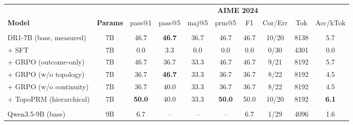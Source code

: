 \begin{table}[!htb]
{\begin{tabular}{@{}l c c c c c c c c c@{}}
\toprule
& & \multicolumn{8}{c}{\textbf{AIME 2024}} \\
\cmidrule(lr){3-10}
\textbf{Model} & \textbf{Params}
  & pass@1 & pass@5 & maj@5 & prm@5 & F1 & Cor/Err & Tok & Acc/kTok \\
\midrule
\rowcolor{gray!8}
\multicolumn{10}{@{}l}{\textit{DR1-7B family}} \\
DR1-7B (base, measured)              & 7B & 46.7           & \textbf{46.7}  & 36.7           & 46.7           & 46.7 & 10/20 & 8138 & 5.7 \\
\quad + SFT                          & 7B & 0.0            & 3.3            & 0.0            & 0.0            & 0.0  & 0/30  & 4301 & 0.0 \\
\quad + GRPO (outcome-only)          & 7B & 46.7           & 36.7           & 33.3           & 46.7           & 46.7 & 9/21  & 8192 & 5.7 \\
\quad + GRPO (w/o topology)          & 7B & 36.7           & \textbf{46.7}  & 33.3           & 36.7           & 36.7 & 8/22  & 8192 & 4.5 \\
\quad + GRPO (w/o continuity)        & 7B & 36.7           & 40.0           & 33.3           & 36.7           & 36.7 & 8/22  & 8192 & 4.5 \\
\rowcolor{blue!5}
\quad + TopoPRM (hierarchical)       & 7B & \textbf{50.0}  & 40.0           & 33.3           & \textbf{50.0}  & 50.0 & 10/20 & 8192 & \textbf{6.1} \\
\midrule
\rowcolor{gray!8}
\multicolumn{10}{@{}l}{\textit{9B family}} \\
Qwen3.5-9B (base)                    & 9B & 6.7            & --             & --             & --             & 6.7  & 1/29  & 4096 & 1.6 \\
\bottomrule
\end{tabular}%
}
\vspace{6pt}
\end{table}
